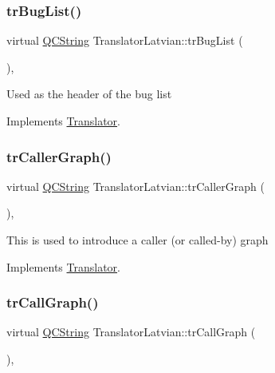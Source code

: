 \subsubsection{\texorpdfstring{trBugList()}{trBugList()}}
{\footnotesize\ttfamily virtual \mbox{\hyperlink{class_q_c_string}{Q\+C\+String}} Translator\+Latvian\+::tr\+Bug\+List (\begin{DoxyParamCaption}{ }\end{DoxyParamCaption})\hspace{0.3cm}{\ttfamily [inline]}, {\ttfamily [virtual]}}

Used as the header of the bug list 

Implements \mbox{\hyperlink{class_translator}{Translator}}.

\mbox{\label{class_translator_latvian_a25807d43d627f1f67657fd1e60a1c3af}} 
\subsubsection{\texorpdfstring{trCallerGraph()}{trCallerGraph()}}
{\footnotesize\ttfamily virtual \mbox{\hyperlink{class_q_c_string}{Q\+C\+String}} Translator\+Latvian\+::tr\+Caller\+Graph (\begin{DoxyParamCaption}{ }\end{DoxyParamCaption})\hspace{0.3cm}{\ttfamily [inline]}, {\ttfamily [virtual]}}

This is used to introduce a caller (or called-\/by) graph 

Implements \mbox{\hyperlink{class_translator}{Translator}}.

\mbox{\label{class_translator_latvian_a79f7503563a22db84b7f4175dfd69c12}} 
\subsubsection{\texorpdfstring{trCallGraph()}{trCallGraph()}}
{\footnotesize\ttfamily virtual \mbox{\hyperlink{class_q_c_string}{Q\+C\+String}} Translator\+Latvian\+::tr\+Call\+Graph (\begin{DoxyParamCaption}{ }\end{DoxyParamCaption})\hspace{0.3cm}{\ttfamily [inline]}, {\ttfamily [virtual]}}


